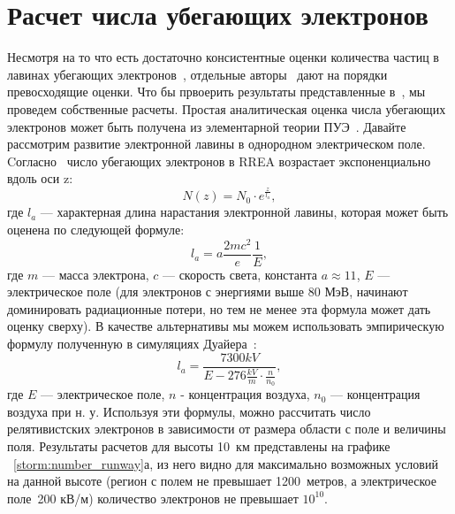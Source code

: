 \section{Расчет числа убегающих электронов}\label{sec:thunderstorm/rrea}
Несмотря на то что есть достаточно консистентные оценки количества частиц в лавинах убегающих электронов~\cite{moss2006, DwyerSmith2005, skeltved2014, Gurevich2001ufn, Dwyer2012}, отдельные авторы~\cite{Oreshkin_2018} дают на порядки превосходящие оценки. Что бы првоерить результаты представленные в~\cite{Oreshkin_2018}, мы проведем собственные расчеты. Простая аналитическая оценка числа убегающих электронов может быть получена из элементарной теории ПУЭ~\cite{Gurevich2001ufn}. Давайте рассмотрим развитие электронной лавины в однородном электрическом поле. Cогласно~\cite{Gurevich2001ufn} число убегающих электронов в RREA возрастает экспоненциально вдоль оси z:
\begin{equation}
\label{storm:exp}
N(z) = N_0 \cdot e^{\frac{z}{l_a}},
\end{equation}
где $l_a$ --- характерная длина нарастания электронной лавины, которая может быть оценена по следующей формуле:
\begin{equation}
l_a = a\frac{2 m c^{2}}{e} \frac{1}{E},
\end{equation}
где $m$ --- масса электрона, $c$ --- скорость света, константа $a \approx 11$, $E$ --- электрическое поле (для электронов с энергиями выше 80 МэВ, начинают доминировать радиационные потери, но тем не менее эта формула может дать оценку сверху). В качестве альтернативы мы можем использовать эмпирическую формулу полученную в симуляциях Дуайера~\cite{Dwyer2007}:
\begin{equation}
\label{storm:dwyer}
l_a = \frac{7300 kV}{E - 276 \frac{kV}{m} \cdot \frac{n}{n_0}},
\end{equation}
где $E$ --- электрическое поле, $n$ - концентрация воздуха, $n_0$ --- концентрация воздуха при н. у. Используя эти формулы, можно рассчитать число релятивистских электронов в зависимости от размера области с поле и величины поля. Результаты расчетов для высоты 10~км представлены на графике ~\ref{storm:number_runway}а, из него видно для максимально возможных условий на данной высоте (регион с полем не превышает 1200~метров, а электрическое поле~200 кВ/м) количество электронов не превышает $10^{10}$.

